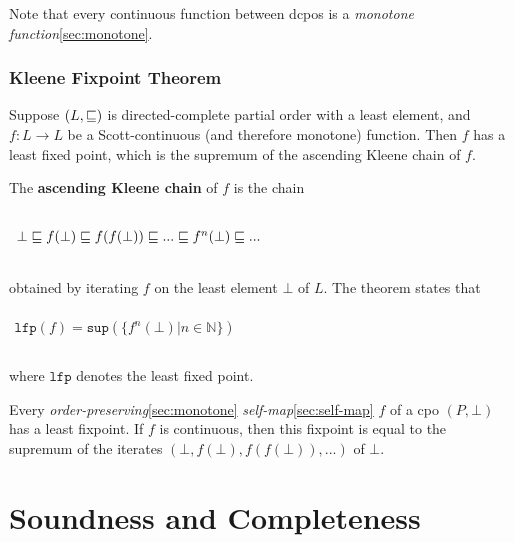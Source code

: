 Note that every continuous function between dcpos is a
\textit{monotone function}\ref{sec:monotone}.


\subsubsection{Kleene Fixpoint Theorem}
\label{sec:fixpoint-theorem}

Suppose $(L, \sqsubseteq)$ is directed-complete partial order with a least
element, and $f: L \to L$ be a Scott-continuous (and therefore
monotone) function. Then $f$ has a least fixed point, which is the
supremum of the ascending Kleene chain of $f$.

The \textbf{ascending Kleene chain} of $f$ is the chain

\begin{math}
  \begin{array}{c}
    \\
    \bot \sqsubseteq f(\bot) \sqsubseteq f(f(\bot)) \sqsubseteq ... \sqsubseteq f^n(\bot) \sqsubseteq ...\\
    \\
  \end{array}
\end{math}

obtained by iterating $f$ on the least element $\bot$ of $L$. The
theorem states that

\begin{math}
  \begin{array}{c}
    \\
    \mathtt{lfp}(f) = \mathtt{sup}( \{ f^n(\bot) | n \in \mathbb{N}\})\\
    \\
  \end{array}
\end{math}

where $\mathtt{lfp}$ denotes the least fixed point.


Every \textit{order-preserving}\ref{sec:monotone}
\textit{self-map}\ref{sec:self-map} $f$ of a cpo $(P, \bot)$ has a
least fixpoint. If $f$ is continuous, then this fixpoint is equal to
the supremum of the iterates $(\bot, f(\bot), f(f(\bot)), ...)$ of
$\bot$.




\section{Soundness and Completeness}

